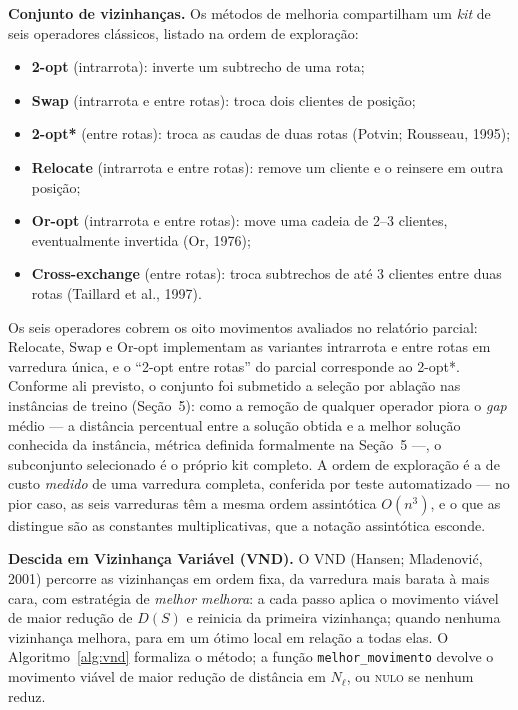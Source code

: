 \documentclass[10pt,a4paper]{article}
\begin{document}
\vspace{\baselineskip}
\textbf{Conjunto de vizinhanças.} Os métodos de melhoria compartilham um \emph{kit} de seis operadores clássicos, listado na ordem de exploração:
\begin{itemize}
\item \textbf{2-opt} (intrarrota): inverte um subtrecho de uma rota;
\item \textbf{Swap} (intrarrota e entre rotas): troca dois clientes de posição;
\item \textbf{2-opt*} (entre rotas): troca as caudas de duas rotas (Potvin; Rousseau, 1995);
\item \textbf{Relocate} (intrarrota e entre rotas): remove um cliente e o reinsere em outra posição;
\item \textbf{Or-opt} (intrarrota e entre rotas): move uma cadeia de 2--3 clientes, eventualmente invertida (Or, 1976);
\item \textbf{Cross-exchange} (entre rotas): troca subtrechos de até 3 clientes entre duas rotas (Taillard et al., 1997).
\end{itemize}
Os seis operadores cobrem os oito movimentos avaliados no relatório parcial: Relocate, Swap e Or-opt implementam as variantes intrarrota e entre rotas em varredura única, e o ``2-opt entre rotas'' do parcial corresponde ao 2-opt*. Conforme ali previsto, o conjunto foi submetido a seleção por ablação nas instâncias de treino (Seção~5): como a remoção de qualquer operador piora o \emph{gap} médio --- a distância percentual entre a solução obtida e a melhor solução conhecida da instância, métrica definida formalmente na Seção~5 ---, o subconjunto selecionado é o próprio kit completo. A ordem de exploração é a de custo \emph{medido} de uma varredura completa, conferida por teste automatizado --- no pior caso, as seis varreduras têm a mesma ordem assintótica $O(n^3)$, e o que as distingue são as constantes multiplicativas, que a notação assintótica esconde.

\vspace{\baselineskip}
\textbf{Descida em Vizinhança Variável (VND).} O VND (Hansen; Mladenovi\'c, 2001) percorre as vizinhanças em ordem fixa, da varredura mais barata à mais cara, com estratégia de \emph{melhor melhora}: a cada passo aplica o movimento viável de maior redução de $D(S)$ e reinicia da primeira vizinhança; quando nenhuma vizinhança melhora, para em um ótimo local em relação a todas elas. O Algoritmo~\ref{alg:vnd} formaliza o método; a função \texttt{melhor\_movimento} devolve o movimento viável de maior redução de distância em $N_{\ell}$, ou \textsc{nulo} se nenhum reduz.
\end{document}
